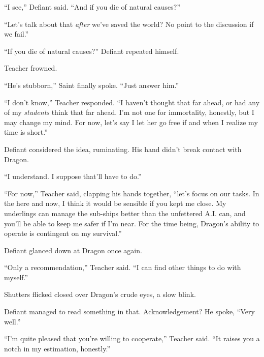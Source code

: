 ``I see,'' Defiant said.  ``And if you die of natural causes?''



``Let's talk about that \emph{after} we've saved the world?  No point to the discussion if we fail.''



``If you die of natural causes?'' Defiant repeated himself.



Teacher frowned.



``He's stubborn,'' Saint finally spoke.  ``Just answer him.''



``I don't know,'' Teacher responded.  ``I haven't thought that far ahead, or had any of my \emph{students} think that far ahead.  I'm not one for immortality, honestly, but I may change my mind.  For now, let's say I let her go free if and when I realize my time is short.''



Defiant considered the idea, ruminating.  His hand didn't break contact with Dragon.



``I understand.  I suppose that'll have to do.''



``For now,'' Teacher said, clapping his hands together, ``let's focus on our tasks.  In the here and now, I think it would be sensible if you kept me close.  My underlings can manage the sub-ships better than the unfettered A.I. can, and you'll be able to keep me safer if I'm near.  For the time being, Dragon's ability to operate is contingent on my survival.''



Defiant glanced down at Dragon once again.



``Only a recommendation,'' Teacher said.  ``I can find other things to do with myself.''



Shutters flicked closed over Dragon's crude eyes, a slow blink.



Defiant managed to read something in that.  Acknowledgement?  He spoke, ``Very well.''



``I'm quite pleased that you're willing to cooperate,'' Teacher said.  ``It raises you a notch in my estimation, honestly.''




